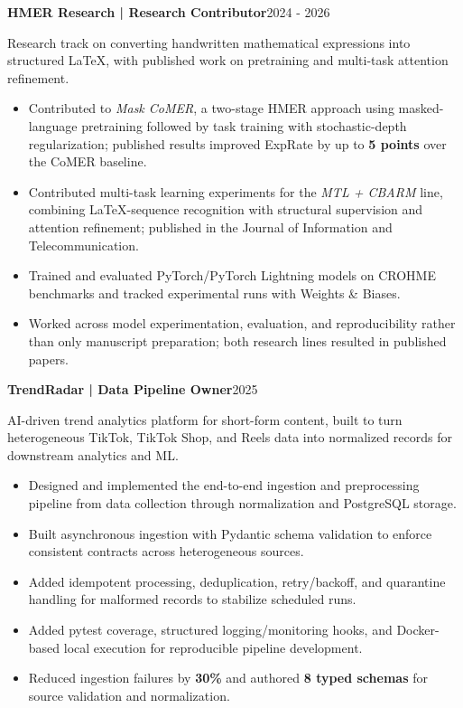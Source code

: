 \documentclass[10pt]{article}
\newcommand{\entry}[2]{%
    \textbf{#1}\hfill {\color{muted}\small #2}\par
}
\newcommand{\subentry}[1]{%
    {\color{muted}\small #1}\par
}
\begin{document}
\entry{HMER Research | Research Contributor}{2024 - 2026}
\subentry{Research track on converting handwritten mathematical expressions into structured LaTeX, with published work on pretraining and multi-task attention refinement.}
\begin{itemize}
    \item Contributed to \textit{Mask CoMER}, a two-stage HMER approach using masked-language pretraining followed by task training with stochastic-depth regularization; published results improved ExpRate by up to \textbf{5 points} over the CoMER baseline.
    \item Contributed multi-task learning experiments for the \textit{MTL + CBARM} line, combining LaTeX-sequence recognition with structural supervision and attention refinement; published in the Journal of Information and Telecommunication.
    \item Trained and evaluated PyTorch/PyTorch Lightning models on CROHME benchmarks and tracked experimental runs with Weights \& Biases.
    \item Worked across model experimentation, evaluation, and reproducibility rather than only manuscript preparation; both research lines resulted in published papers.
\end{itemize}

\entry{TrendRadar | Data Pipeline Owner}{2025}
\subentry{AI-driven trend analytics platform for short-form content, built to turn heterogeneous TikTok, TikTok Shop, and Reels data into normalized records for downstream analytics and ML.}
\begin{itemize}
    \item Designed and implemented the end-to-end ingestion and preprocessing pipeline from data collection through normalization and PostgreSQL storage.
    \item Built asynchronous ingestion with Pydantic schema validation to enforce consistent contracts across heterogeneous sources.
    \item Added idempotent processing, deduplication, retry/backoff, and quarantine handling for malformed records to stabilize scheduled runs.
    \item Added pytest coverage, structured logging/monitoring hooks, and Docker-based local execution for reproducible pipeline development.
    \item Reduced ingestion failures by \textbf{30\%} and authored \textbf{8 typed schemas} for source validation and normalization.
\end{itemize}
\end{document}
